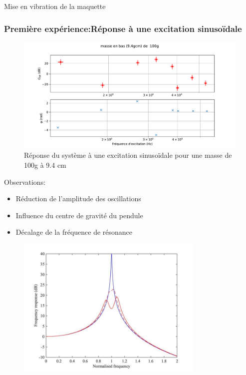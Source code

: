 \documentclass{beamer}
\begin{document}
	\begin{frame}{Mise en vibration de la maquette}
		\frametitle{Première expérience:Réponse à une excitation sinusoïdale}
		\centering
		\begin{figure}
			
		
		\includegraphics[scale=0.34]{Image/masse_en_bas_(9.4gcm)_de__100g.pdf}
	\caption{Réponse du système à une excitation sinusoïdale pour une masse de 100g à 9.4 cm }
	\end{figure}
		Observations:
		\begin{itemize}
			\item Réduction de l'amplitude des oscillations
			\item Influence du centre de gravité du pendule
			\item Décalage de la fréquence de résonance  
		\end{itemize}
		
	\end{frame}
	
	\begin{frame}{}
		\begin{figure}
			\includegraphics[width=0.8\textwidth]{Image/Objectif en courbe.jpg}
		\end{figure}
	\end{frame}	
\end{document}
